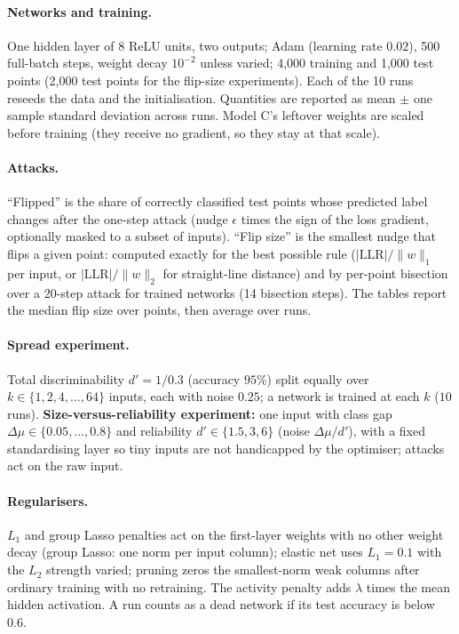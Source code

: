 \documentclass[11pt]{article}
\begin{document}
\paragraph{Networks and training.} One hidden layer of 8 ReLU units, two outputs; Adam (learning rate $0.02$), 500 full-batch steps, weight decay $10^{-2}$ unless varied; 4{,}000 training and 1{,}000 test points (2{,}000 test points for
the flip-size experiments). Each of the 10 runs reseeds the data and the initialisation. Quantities are reported as mean $\pm$ one sample standard deviation across runs. Model C's leftover weights are scaled before training (they receive no gradient, so they stay at that scale).

\paragraph{Attacks.} ``Flipped'' is the share of correctly classified test points whose predicted label changes after the one-step attack (nudge $\epsilon$ times the sign of the loss gradient, optionally masked to a subset of inputs).
``Flip size'' is the smallest nudge that flips a given point: computed exactly for the best possible rule ($|\text{LLR}|/\|w\|_1$ per input, or $|\text{LLR}|/\|w\|_2$ for straight-line distance) and by per-point bisection over a 20-step attack for trained networks (14 bisection steps).
The tables report the median flip size over points, then average over runs.

\paragraph{Spread experiment.} Total discriminability $d'=1/0.3$ (accuracy $95\%$) split equally over $k\in\{1,2,4,\ldots,64\}$ inputs, each with noise $0.25$; a network is trained at each $k$ ($10$ runs).
\textbf{Size-versus-reliability experiment:} one input with class gap $\Delta\mu\in\{0.05,\ldots,0.8\}$ and reliability $d'\in\{1.5,3,6\}$ (noise $\Delta\mu/d'$), with a fixed standardising layer so tiny inputs are not handicapped by the optimiser; attacks act on the raw input.

\paragraph{Regularisers.} $L_1$ and group Lasso penalties act on the first-layer weights with no other weight decay (group Lasso: one norm per input column); elastic net uses $L_1=0.1$ with the $L_2$ strength varied; pruning zeros the smallest-norm weak columns after ordinary training with no retraining. The activity penalty adds
$\lambda$ times the mean hidden activation. A run counts as a dead network if its test accuracy is below $0.6$.
\end{document}
